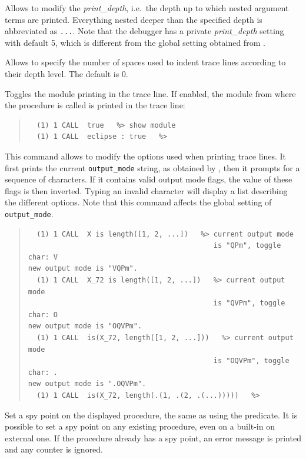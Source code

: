 \begin{descr}{1cm}

Allows to modify the {\it print_depth}, i.e.\ the depth up to which
nested argument terms are printed. Everything nested deeper than the
specified depth is abbreviated as \verb:...:.
Note that the debugger has a private {\it print_depth} setting with
default 5, which is different from the global setting obtained from
.

Allows to specify the number of spaces used to indent trace lines according
to their depth level. The default is 0.

Toggles the module printing in the trace line.
If enabled, the module from where the procedure is called
is printed in the trace line:
\begin{quote}\begin{verbatim}
  (1) 1 CALL  true   %> show module
  (1) 1 CALL  eclipse : true   %> 
\end{verbatim}\end{quote}

This command allows to modify the options used when printing trace lines.
It first prints the current {\tt output_mode} string, as obtained by
,
then it prompts for a sequence of characters.
If it contains valid output mode flags, the value
of these flags is then inverted.
Typing an invalid character will display a list describing the different
options.
Note that this command affects the global setting of {\tt output_mode}.

\begin{quote}\begin{verbatim}
  (1) 1 CALL  X is length([1, 2, ...])   %> current output mode
                                            is "QPm", toggle char: V
new output mode is "VQPm".
  (1) 1 CALL  X_72 is length([1, 2, ...])   %> current output mode
                                            is "QVPm", toggle char: O
new output mode is "OQVPm".
  (1) 1 CALL  is(X_72, length([1, 2, ...]))   %> current output mode
                                            is "OQVPm", toggle char: .
new output mode is ".OQVPm".
  (1) 1 CALL  is(X_72, length(.(1, .(2, .(...)))))   %> 
\end{verbatim}\end{quote}

Set a spy point on the displayed procedure, the same as using the
 predicate.
It is possible to set a spy point on any existing procedure,
even on a built-in on external one.
If the procedure already has a spy point, an error message is printed
and any counter is ignored.


\end{descr}
